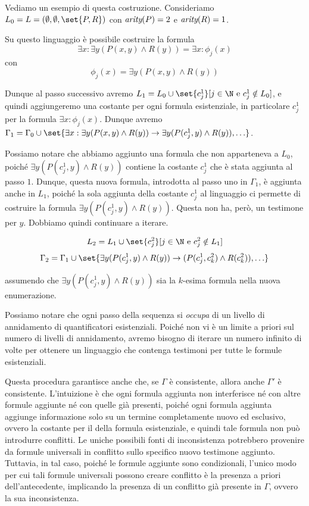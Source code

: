 \begin{example}{}
  Vediamo un esempio di questa costruzione. Consideriamo \(L_0 = L = (\emptyset, \emptyset,\set{P,R})\) con \(\operatorname{\textit{arity}}(P) = 2\) e \(\operatorname{\textit{arity}}(R) = 1\).

  Su questo linguaggio è possibile costruire la formula
  \[\exists x:\exists y (P(x,y) \land R(y)) = \exists x: \phi_j(x)\]
  con
  \[\phi_j(x) = \exists y (P(x,y) \land R(y))\]

  Dunque al passo successivo avremo \(L_1 = L_0 \cup \set{c_j^1}[j \in \N \text{ e } c_j^1 \notin L_0]\), e quindi aggiungeremo una costante per ogni formula esistenziale, in particolare \(c_j^1\) per la formula \(\exists x: \phi_j(x)\). Dunque avremo \(\Gamma_1 = \Gamma_0 \cup \set{\exists x: \exists y (P(x,y) \land R(y)) \to \exists y (P(c_j^1,y) \land R(y)), \ldots} \).

  Possiamo notare che abbiamo aggiunto una formula che non apparteneva a \(L_0\), poiché \(\exists y (P(c_j^1,y) \land R(y))\) contiene la costante \(c_j^1\) che è stata aggiunta al passo \(1\). Dunque, questa nuova formula, introdotta al passo uno in \(\Gamma_1\), è aggiunta anche in \(L_1\), poiché la sola aggiunta della costante \(c_j^1\) al linguaggio ci permette di costruire la formula \(\exists y (P(c_j^1,y) \land R(y))\). Questa non ha, però, un testimone per \(y\). Dobbiamo quindi continuare a iterare.

  \[L_2 = L_1 \cup \set{c_j^2}[j \in \N \text{ e } c_j^2 \notin L_1]\]
  \[\Gamma_2 = \Gamma_1 \cup \set{\exists y (P(c_j^1,y) \land R(y)) \to (P(c_j^1,c_k^2) \land R(c_k^2)), \ldots}\]

  assumendo che \(\exists y (P(c_j^1,y) \land R(y))\) sia la \(k\)-esima formula nella nuova enumerazione.

  Possiamo notare che ogni passo della sequenza si \textit{occupa} di un livello di annidamento di quantificatori esistenziali. Poiché non vi è un limite a priori sul numero di livelli di annidamento, avremo bisogno di iterare un numero infinito di volte per ottenere un linguaggio che contenga testimoni per tutte le formule esistenziali.
\end{example}

Questa procedura garantisce anche che, se \(\Gamma\) è consistente, allora anche \(\Gamma'\) è consistente. L'intuizione è che ogni formula aggiunta non interferisce né con altre formule aggiunte né con quelle già presenti, poiché ogni formula aggiunta aggiunge informazione solo su un termine completamente nuovo ed esclusivo, ovvero la costante per il  della formula esistenziale, e quindi tale formula non può introdurre conflitti. Le uniche possibili fonti di inconsistenza potrebbero provenire da formule universali in conflitto sullo specifico nuovo testimone aggiunto. Tuttavia, in tal caso, poiché le formule aggiunte sono condizionali, l'unico modo per cui tali formule universali possono creare conflitto è la presenza a priori dell'antecedente, implicando la presenza di un conflitto già presente in \(\Gamma\), ovvero la sua inconsistenza.

